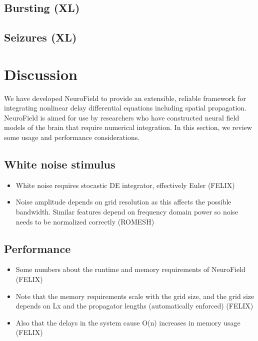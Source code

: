 \documentclass[preprint,review,10pt,authoryear,letterpaper]{elsarticle}
\begin{document}
\subsection{Bursting (XL)}

\subsection{Seizures (XL)}

\section{Discussion}
\label{sec:discussion}

We have developed NeuroField to provide an extensible, reliable framework for integrating nonlinear delay differential equations including spatial propagation. NeuroField is aimed for use by researchers who have constructed neural field models of the brain that require numerical integration. In this section, we review some usage and performance considerations.

\subsection{White noise stimulus}
\begin{itemize}
	\item White noise requires stocastic DE integrator, effectively Euler (FELIX)
	\item Noise amplitude depends on grid resolution as this affects the possible bandwidth. Similar features depend on frequency domain power so noise needs to be normalized correctly (ROMESH)
\end{itemize}

\subsection{Performance}

\begin{itemize}
\item Some numbers about the runtime and memory requirements of NeuroField (FELIX)
\item Note that the memory requirements scale with the grid size, and the grid size depends on Lx and the propagator lengths (automatically enforced) (FELIX)
\item Also that the delays in the system cause O(n) increases in memory usage (FELIX)
\end{itemize}
\end{document}
